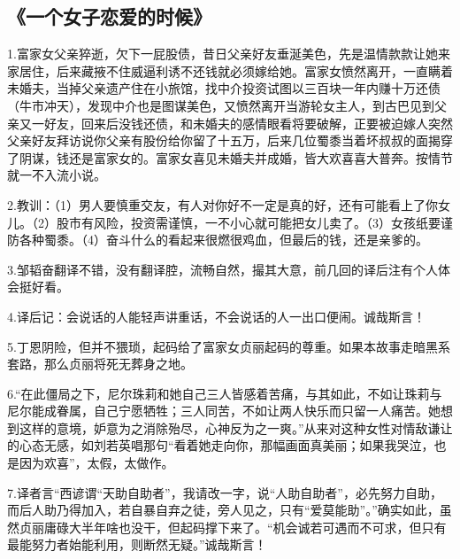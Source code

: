 
\subsection{《一个女子恋爱的时候》}
1.富家女父亲猝逝，欠下一屁股债，昔日父亲好友垂涎美色，先是温情款款让她来家居住，后来藏掖不住威逼利诱不还钱就必须嫁给她。富家女愤然离开，一直瞒着未婚夫，当掉父亲遗产住在小旅馆，找中介投资试图以三百块一年内赚十万还债（牛市冲天），发现中介也是图谋美色，又愤然离开当游轮女主人，到古巴见到父亲又一好友，回来后没钱还债，和未婚夫的感情眼看将要破解，正要被迫嫁人突然父亲好友拜访说你父亲有股份给你留了十五万，后来几位蜀黍当着坏叔叔的面揭穿了阴谋，钱还是富家女的。富家女喜见未婚夫并成婚，皆大欢喜喜大普奔。按情节就一不入流小说。

2.教训：（1）男人要慎重交友，有人对你好不一定是真的好，还有可能看上了你女儿。（2）股市有风险，投资需谨慎，一不小心就可能把女儿卖了。（3）女孩纸要谨防各种蜀黍。（4）奋斗什么的看起来很燃很鸡血，但最后的钱，还是亲爹的。

3.邹韬奋翻译不错，没有翻译腔，流畅自然，撮其大意，前几回的译后注有个人体会挺好看。

4.译后记：会说话的人能轻声讲重话，不会说话的人一出口便闹。诚哉斯言！

5.丁恩阴险，但并不猥琐，起码给了富家女贞丽起码的尊重。如果本故事走暗黑系套路，那么贞丽将死无葬身之地。

6.“在此僵局之下，尼尔珠莉和她自己三人皆感着苦痛，与其如此，不如让珠莉与尼尔能成眷属，自己宁愿牺牲；三人同苦，不如让两人快乐而只留一人痛苦。她想到这样的意境，妒意为之消除殆尽，心神反为之一爽。”从来对这种女性对情敌谦让的心态无感，如刘若英唱那句“看着她走向你，那幅画面真美丽；如果我哭泣，也是因为欢喜”，太假，太做作。

7.译者言“西谚谓“天助自助者”，我请改一字，说“人助自助者”，必先努力自助，而后人助乃得加入，若自暴自弃之徒，旁人见之，只有“爱莫能助”。”确实如此，虽然贞丽庸碌大半年啥也没干，但起码撑下来了。“机会诚若可遇而不可求，但只有最能努力者始能利用，则断然无疑。”诚哉斯言！
